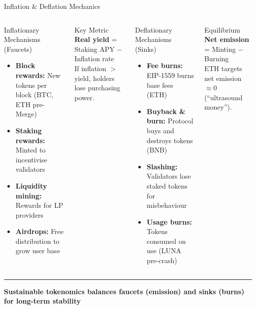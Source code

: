 \documentclass[8pt,aspectratio=169]{beamer}
\newcommand{\bottomnote}[1]{\vfill\vspace{-2mm}\textcolor{mllavender2}{\rule{\textwidth}{0.4pt}}\vspace{1mm}\footnotesize\textbf{#1}}
\begin{document}
\begin{frame}{Inflation \& Deflation Mechanics}
\begin{columns}[T]
\begin{block}{Inflationary Mechanisms (Faucets)}
\footnotesize
\begin{itemize}
  \item \textbf{Block rewards:} New tokens per block (BTC, ETH pre-Merge)
  \item \textbf{Staking rewards:} Minted to incentivise validators
  \item \textbf{Liquidity mining:} Rewards for LP providers
  \item \textbf{Airdrops:} Free distribution to grow user base
\end{itemize}
\end{block}
\vspace{1mm}
\begin{alertblock}{\footnotesize Key Metric}
\footnotesize
\textbf{Real yield} = Staking APY $-$ Inflation rate\\
If inflation $>$ yield, holders lose purchasing power.
\end{alertblock}

\begin{block}{Deflationary Mechanisms (Sinks)}
\footnotesize
\begin{itemize}
  \item \textbf{Fee burns:} EIP-1559 burns base fees (ETH)
  \item \textbf{Buyback \& burn:} Protocol buys and destroys tokens (BNB)
  \item \textbf{Slashing:} Validators lose staked tokens for misbehaviour
  \item \textbf{Usage burns:} Tokens consumed on use (LUNA pre-crash)
\end{itemize}
\end{block}
\vspace{1mm}
\begin{exampleblock}{\footnotesize Equilibrium}
\footnotesize
\textbf{Net emission} = Minting $-$ Burning\\
ETH targets net emission $\approx 0$ (``ultrasound money'').
\end{exampleblock}
\end{columns}
\bottomnote{Sustainable tokenomics balances faucets (emission) and sinks (burns) for long-term stability}
\end{frame}
\end{document}
